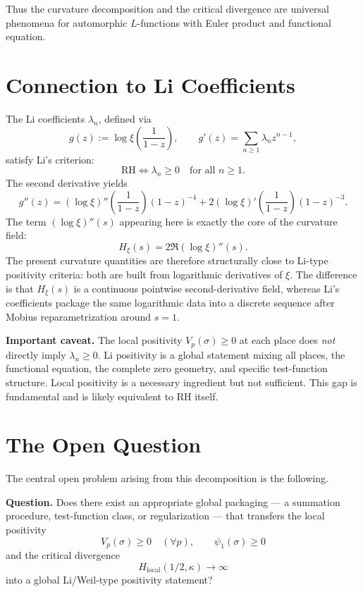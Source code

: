 \documentclass[11pt]{article}
\begin{document}
Thus the curvature decomposition and the critical divergence are universal phenomena for automorphic $L$-functions with Euler product and functional equation.

\section{Connection to Li Coefficients}

The Li coefficients $\lambda_n$, defined via
\[
g(z):=\log \xi\left(\frac{1}{1-z}\right),
\qquad
g'(z)=\sum_{n\ge 1}\lambda_n z^{n-1},
\]
satisfy Li's criterion:
\[
\mathrm{RH}\iff \lambda_n\ge 0\quad\text{for all }n\ge 1.
\]
The second derivative yields
\begin{equation}
g''(z)=(\log \xi)''\!\left(\frac{1}{1-z}\right)(1-z)^{-4}
+2(\log \xi)'\!\left(\frac{1}{1-z}\right)(1-z)^{-3}.
\tag{6}
\end{equation}
The term $(\log \xi)''(s)$ appearing here is exactly the core of the curvature field:
\[
H_{\xi}(s)=2\Re (\log \xi)''(s).
\]
The present curvature quantities are therefore structurally close to Li-type positivity criteria: both are built from logarithmic derivatives of $\xi$. The difference is that $H_{\xi}(s)$ is a continuous pointwise second-derivative field, whereas Li's coefficients package the same logarithmic data into a discrete sequence after Mobius reparametrization around $s=1$.

\medskip
\textbf{Important caveat.} The local positivity $V_p(\sigma)\ge 0$ at each place does \emph{not} directly imply $\lambda_n\ge 0$. Li positivity is a global statement mixing all places, the functional equation, the complete zero geometry, and specific test-function structure. Local positivity is a necessary ingredient but not sufficient. This gap is fundamental and is likely equivalent to RH itself.

\section{The Open Question}

The central open problem arising from this decomposition is the following.

\medskip
\textbf{Question.} Does there exist an appropriate global packaging --- a summation procedure, test-function class, or regularization --- that transfers the local positivity
\[
V_p(\sigma)\ge 0\quad(\forall p),
\qquad
\psi_1(\sigma)\ge 0
\]
and the critical divergence
\[
H_{\mathrm{local}}(1/2,\kappa)\to \infty
\]
into a global Li/Weil-type positivity statement?
\end{document}
